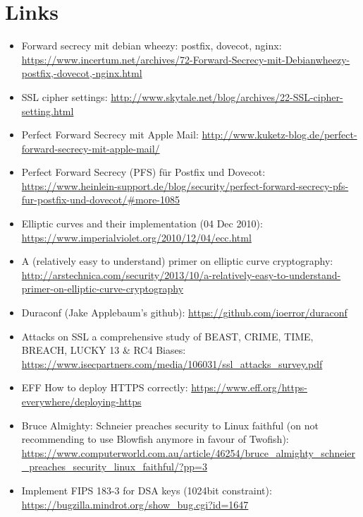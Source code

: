 \section{Links}



\begin{itemize}
\item Forward secrecy mit debian wheezy: postfix, dovecot, nginx: \url{https://www.incertum.net/archives/72-Forward-Secrecy-mit-Debianwheezy-postfix,-dovecot,-nginx.html}
\item SSL cipher settings: \url{http://www.skytale.net/blog/archives/22-SSL-cipher-setting.html}
\item Perfect Forward Secrecy mit Apple Mail: \url{http://www.kuketz-blog.de/perfect-forward-secrecy-mit-apple-mail/}
\item Perfect Forward Secrecy (PFS) f\"ur Postfix und Dovecot: \url{https://www.heinlein-support.de/blog/security/perfect-forward-secrecy-pfs-fur-postfix-und-dovecot/#more-1085}
\item Elliptic curves and their implementation (04 Dec 2010): \url{https://www.imperialviolet.org/2010/12/04/ecc.html}
\item A (relatively easy to understand) primer on elliptic curve cryptography: \url{http://arstechnica.com/security/2013/10/a-relatively-easy-to-understand-primer-on-elliptic-curve-cryptography}
\item Duraconf (Jake Applebaum's github): \url{https://github.com/ioerror/duraconf}
\item Attacks on SSL a comprehensive study of BEAST, CRIME, TIME, BREACH, LUCKY 13 \& RC4 Biases: \url{https://www.isecpartners.com/media/106031/ssl_attacks_survey.pdf}
\item EFF How to deploy HTTPS correctly: \url{https://www.eff.org/https-everywhere/deploying-https}
\item Bruce Almighty: Schneier preaches security to Linux faithful (on not recommending to use Blowfish anymore in favour of Twofish): \url{https://www.computerworld.com.au/article/46254/bruce_almighty_schneier_preaches_security_linux_faithful/?pp=3}
\item Implement FIPS 183-3 for DSA keys (1024bit constraint): \url{https://bugzilla.mindrot.org/show_bug.cgi?id=1647}
\end{itemize}
